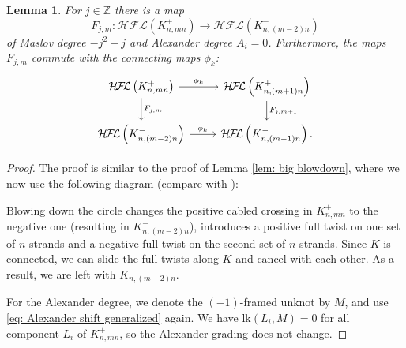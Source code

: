\documentclass{amsart}
\newtheorem{lemma}[theorem]{Lemma}
\newcommand{\cHFL}{\mathcal{H\!F\! L}}
\newcommand{\lk}{\mathrm{lk}}
\newcommand{\Z}{\mathbb{Z}}
\begin{document}
\begin{lemma}
\label{lem: big blowdown 2}
For $j\in \Z$ there is a map 
$$
F_{j,m}: \cHFL\left(K^+_{n,mn}\right)\to \cHFL\left(K^-_{n,(m-2)n}\right)
$$
of Maslov degree $-j^2-j$ and Alexander degree $A_i=0$. Furthermore, the maps $F_{j,m}$ commute with the connecting maps $\phi_k$:
$$
\begin{tikzcd}
\cHFL\left(K^+_{n,mn}\right) \arrow{r}{\phi_k} \arrow{d}{F_{j,m}}& \cHFL\left(K^+_{n,(m+1)n}\right) \arrow{d}{F_{j,m+1}}\\
\cHFL\left(K^-_{n,(m-2)n}\right) \arrow{r}{\phi_k}& \cHFL\left(K^-_{n,(m-1)n}\right).
\end{tikzcd}
$$
\end{lemma}

\begin{proof}
The proof is similar to the proof of Lemma \ref{lem: big blowdown}, where we now use the following diagram (compare with \cite[Proposition 3.1]{AGL}):
\begin{center}
\end{center}
Blowing down the circle changes the positive cabled crossing in $K^+_{n,mn}$ to the negative one (resulting in $K^-_{n,(m-2)n}$), introduces a positive full twist on one set of $n$ strands and a negative full twist on the second set of $n$ strands. Since $K$ is connected, we can slide the full twists along $K$ and cancel with each other. As a result, we are left with $K^-_{n,(m-2)n}$. 

For the Alexander degree, we denote the $(-1)$-framed unknot by $M$, and  use \eqref{eq: Alexander shift generalized} again. We have $\lk(L_i,M)=0$ for all component $L_i$ of $K^+_{n, mn}$, so the Alexander grading does not change. 
 \end{proof}
\end{document}
